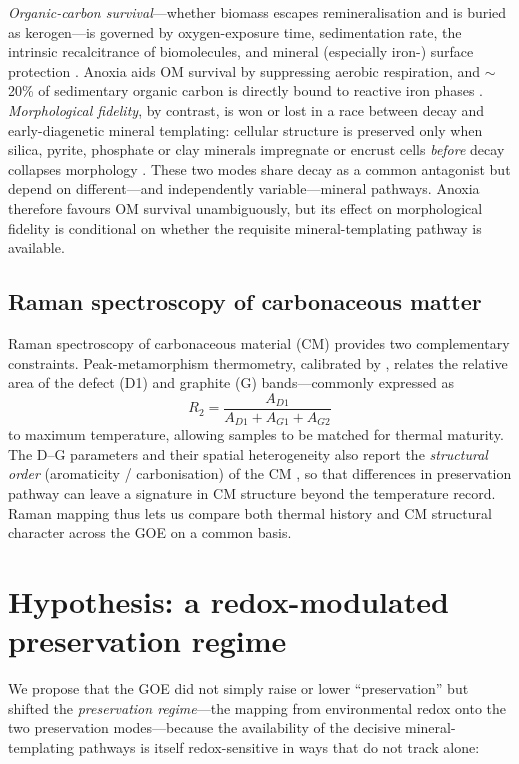 \documentclass[11pt]{article}
\begin{document}
\emph{Organic-carbon survival}---whether biomass escapes remineralisation and is buried as
kerogen---is governed by oxygen-exposure time, sedimentation rate, the intrinsic recalcitrance of
biomolecules, and mineral (especially iron-) surface protection
\citep{Canfield1994,Hedges1995,Hartnett1998,Lalonde2012}. Anoxia aids OM survival by suppressing
aerobic respiration, and $\sim$20\% of sedimentary organic carbon is directly bound to reactive
iron phases \citep{Lalonde2012}. \emph{Morphological fidelity}, by contrast, is won or lost in a
race between decay and early-diagenetic mineral templating: cellular structure is preserved only
when silica, pyrite, phosphate or clay minerals impregnate or encrust cells \emph{before} decay
collapses morphology \citep{Wacey2012}. These two modes share decay as a common antagonist but
depend on different---and independently variable---mineral pathways. Anoxia therefore favours OM
survival unambiguously, but its effect on morphological fidelity is conditional on whether the
requisite mineral-templating pathway is available.

\subsection{Raman spectroscopy of carbonaceous matter}

Raman spectroscopy of carbonaceous material (CM) provides two complementary constraints.
Peak-metamorphism thermometry, calibrated by \citet{Beyssac2002}, relates the relative area of the
defect (D1) and graphite (G) bands---commonly expressed as
\begin{equation}
R_2 = \frac{A_{D1}}{A_{D1}+A_{G1}+A_{G2}}
\end{equation}
to maximum temperature, allowing samples to be matched for thermal maturity. The D--G parameters
and their spatial heterogeneity also report the \emph{structural order} (aromaticity /
carbonisation) of the CM \citep{Qu2019}, so that differences in preservation pathway can leave a
signature in CM structure beyond the temperature record. Raman mapping thus lets us compare both
thermal history and CM structural character across the GOE on a common basis.

\section{Hypothesis: a redox-modulated preservation regime}

We propose that the GOE did not simply raise or lower ``preservation'' but shifted the
\emph{preservation regime}---the mapping from environmental redox onto the two preservation
modes---because the availability of the decisive mineral-templating pathways is itself
redox-sensitive in ways that do not track  alone:
\end{document}
